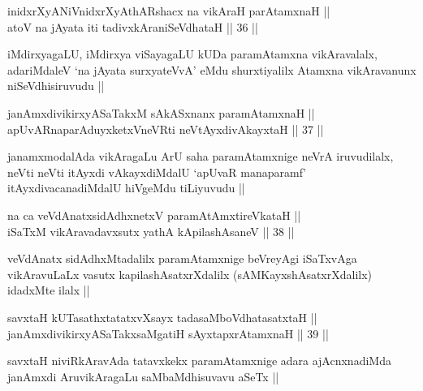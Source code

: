 
\begin{shl}
inidxrXyANiVnidxrXyAthARshacx na vikAraH parAtamxnaH || \\
atoV na jAyata iti tadivxkAraniSeVdhataH ||  36 ||  
\end{shl}

\begin{artha}
iMdirxyagaLU, iMdirxya viSayagaLU kUDa paramAtamxna vikAravalalx,
adariMdaleV `na jAyata surxyateVvA' eMdu shurxtiyalilx Atamxna
vikAravanunx niSeVdhisiruvudu ||
\end{artha}

\begin{shl}
janAmxdivikirxyASaTakxM sAkASxnanx paramAtamxnaH || \\
apUvARnaparAduyxketxVneVRti neVtAyxdivAkayxtaH ||  37 ||  
\end{shl}

\begin{artha}
janamxmodalAda vikAragaLu ArU saha paramAtamxnige neVrA iruvudilalx,
neVti neVti itAyxdi vAkayxdiMdalU `apUvaR manaparamf'
itAyxdivacanadiMdalU hiVgeMdu tiLiyuvudu ||
\end{artha}


\begin{shl}
na ca veVdAnatxsidAdhxnetxV paramAtAmxtireVkataH || \\
iSaTxM vikAravadavxsutx yathA kApilashAsaneV ||  38 || 
\end{shl}

\begin{artha}
veVdAnatx sidAdhxMtadalilx paramAtamxnige beVreyAgi iSaTxvAga
vikAravuLaLx vasutx kapilashAsatxrXdalilx (sAMKayxshAsatxrXdalilx)
idadxMte ilalx ||
\end{artha}


\begin{shl}
savxtaH kUTasathxtatatxvXsayx tadasaMboVdhatasatxtaH || \\
janAmxdivikirxyASaTakxsaMgatiH sAyxtapxrAtamxnaH ||  39 ||  
\end{shl}

\begin{artha}
savxtaH niviRkAravAda tatavxkekx paramAtamxnige adara ajAcnxnadiMda
janAmxdi AruvikAragaLu saMbaMdhisuvavu aSeTx ||
\end{artha}

